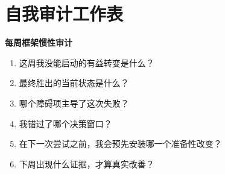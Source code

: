 \section{自我审计工作表}

\begin{templatebox}
\textbf{每周框架惯性审计}
\begin{enumerate}[nosep]
  \item 这周我没能启动的有益转变是什么？
  \item 最终胜出的当前状态是什么？
  \item 哪个障碍项主导了这次失败？
  \item 我错过了哪个决策窗口？
  \item 在下一次尝试之前，我会预先安装哪一个准备性改变？
  \item 下周出现什么证据，才算真实改善？
\end{enumerate}
\end{templatebox}